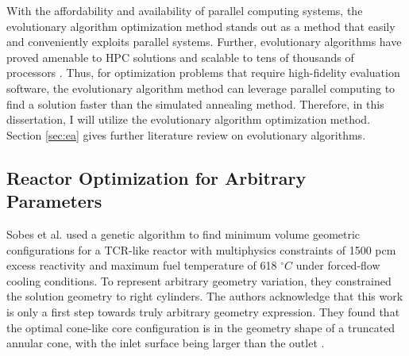 With the affordability and availability of parallel computing systems, the 
evolutionary algorithm optimization method stands out as a method 
that easily and conveniently exploits parallel systems. 
Further, evolutionary algorithms have proved amenable to \gls{HPC} solutions and 
scalable to tens of thousands of processors \cite{kropaczek_constraint_2019}. 
Thus, for optimization problems that require high-fidelity evaluation software, 
the evolutionary algorithm method can leverage parallel computing to find a 
solution faster than the simulated annealing method.
Therefore, in this dissertation, I will utilize the evolutionary algorithm 
optimization method. 
Section \ref{sec:ea} gives further literature review on evolutionary algorithms.

\subsection{Reactor Optimization for Arbitrary Parameters}
Sobes et al. \cite{sobes_artificial_2020} used a genetic algorithm to find 
minimum volume geometric configurations for a \gls{TCR}-like reactor with 
multiphysics constraints of 1500 pcm excess reactivity and maximum fuel 
temperature of 618 $^{\circ}C$ under forced-flow cooling conditions. 
To represent arbitrary geometry variation, they constrained the solution geometry 
to right cylinders. 
The authors acknowledge that this work is only a first step towards truly 
arbitrary geometry expression. 
They found that the optimal cone-like core configuration is in the geometry 
shape of a truncated annular cone, with the inlet surface being larger than 
the outlet \cite{sobes_artificial_2020}.

